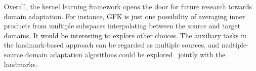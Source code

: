Overall, the kernel learning framework opens the door for future research towards domain adaptation. For instance, GFK is just one possibility of averaging inner products from multiple subspaces interpolating between the source and target domains. It would be interesting to explore other choices. The auxiliary tasks in the landmark-based approach can be regarded as multiple sources, and multiple-source domain adaptation algorithms could be explored~\cite{dam,dredze08multi} jointly with the landmarks.

{

}


